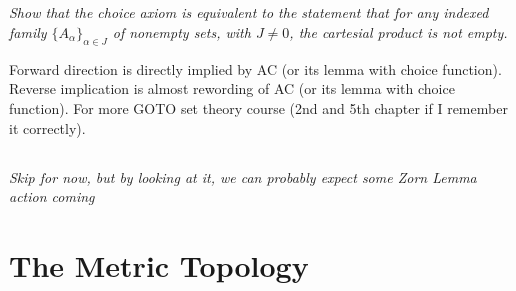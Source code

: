 \documentclass[11pt,oneside,titlepage]{book}
\newcommand{\set}[1]{\{ #1 \}}
\begin{document}
\subsection{}

\textit{Show that the choice axiom is equivalent to the statement that for any indexed family
  $\set{A_\alpha}_{\alpha \in J}$ of nonempty sets, with $J \neq 0$, the cartesial product is
  not empty.}

Forward direction is directly implied by AC (or its lemma with choice function).
Reverse implication is almost rewording of AC (or its lemma with choice function).
For more GOTO set theory course (2nd and 5th chapter if I remember it correctly).

\subsection{}

\textit{Skip for now, but by looking at it, we can probably expect some Zorn Lemma action coming}

\section{The Metric Topology}
\end{document}
